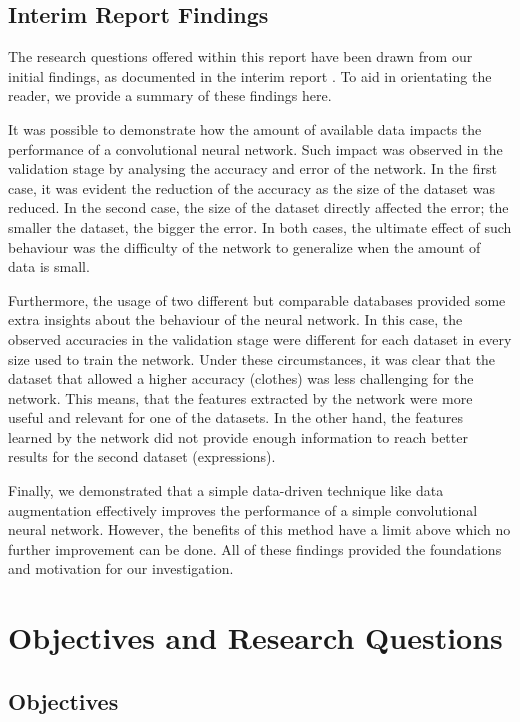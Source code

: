 \documentclass{article}
\begin{document}
\subsection{Interim Report Findings}
\label{sec:findings}

The research questions offered within this report have been drawn from our initial findings, as documented in the interim report \cite{interim-report}. To aid in orientating the reader, we provide a summary of these findings here.

It was possible to demonstrate how the amount of available data impacts the performance of a convolutional neural network. Such impact was observed in the validation stage by analysing the accuracy and error of the network. In the first case, it was evident the reduction of the accuracy as the size of the dataset was reduced. In the second case, the size of the dataset directly affected the error; the smaller the dataset, the bigger the error. In both cases, the ultimate effect of such behaviour was the difficulty of the network to generalize when the amount of data is small.

Furthermore, the usage of two different but comparable databases provided some extra insights about the behaviour of the neural network. In this case, the observed accuracies in the validation stage were different for each dataset in every size used to train the network. Under these circumstances, it was clear that the dataset that allowed a higher accuracy (clothes) was less challenging for the network. This means, that the features extracted by the network were more useful and relevant for one of the datasets. In the other hand, the features learned by the network did not provide enough information to reach better results for the second dataset (expressions).

Finally, we demonstrated that a simple data-driven technique like data augmentation effectively improves the performance of a simple convolutional neural network. However, the benefits of this method have a limit above which no further improvement can be done. All of these findings provided the foundations and motivation for our investigation.

\section{Objectives and Research Questions}
\label{sec:obj_questions}

\subsection{Objectives}
\label{sec:objectives}
\end{document}
